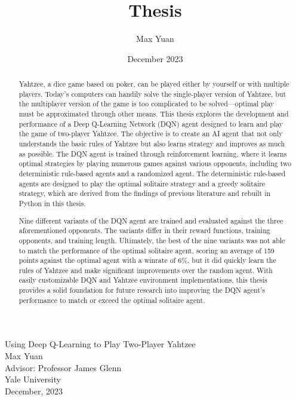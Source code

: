 \documentclass[12pt]{article}
\title{Thesis}
\author{Max Yuan}
\date{December 2023}
\begin{document}
\begin{titlepage}
    \thispagestyle{empty} %
    \centering
    \Huge
    Using Deep Q-Learning to Play Two-Player Yahtzee\\
    \vspace{10mm}
    \Large
    Max Yuan\\
    Advisor: Professor James Glenn\\
    \vspace{10mm}
    Yale University\\
    December, 2023
\end{titlepage}

\newpage
\begin{abstract}
\noindent
Yahtzee, a dice game based on poker, can be played either by yourself or with multiple players. Today's computers can handily solve the single-player version of Yahtzee, but the multiplayer version of the game is too complicated to be solved—optimal play must be approximated through other means. This thesis explores the development and performance of a Deep Q-Learning Network (DQN) agent designed to learn and play the game of two-player Yahtzee. The objective is to create an AI agent that not only understands the basic rules of Yahtzee but also learns strategy and improves as much as possible. The DQN agent is trained through reinforcement learning, where it learns optimal strategies by playing numerous games against various opponents, including two deterministic rule-based agents and a randomized agent. The deterministic rule-based agents are designed to play the optimal solitaire strategy and a greedy solitaire strategy, which are derived from the findings of previous literature and rebuilt in Python in this thesis.

Nine different variants of the DQN agent are trained and evaluated against the three aforementioned opponents. The variants differ in their reward functions, training opponents, and training length. Ultimately, the best of the nine variants was not able to match the performance of the optimal solitaire agent, scoring an average of 159 points against the optimal agent with a winrate of 6\%, but it did quickly learn the rules of Yahtzee and make significant improvements over the random agent. With easily customizable DQN and Yahtzee environment implementations, this thesis provides a solid foundation for future research into improving the DQN agent's performance to match or exceed the optimal solitaire agent.
\end{abstract}
\end{document}
